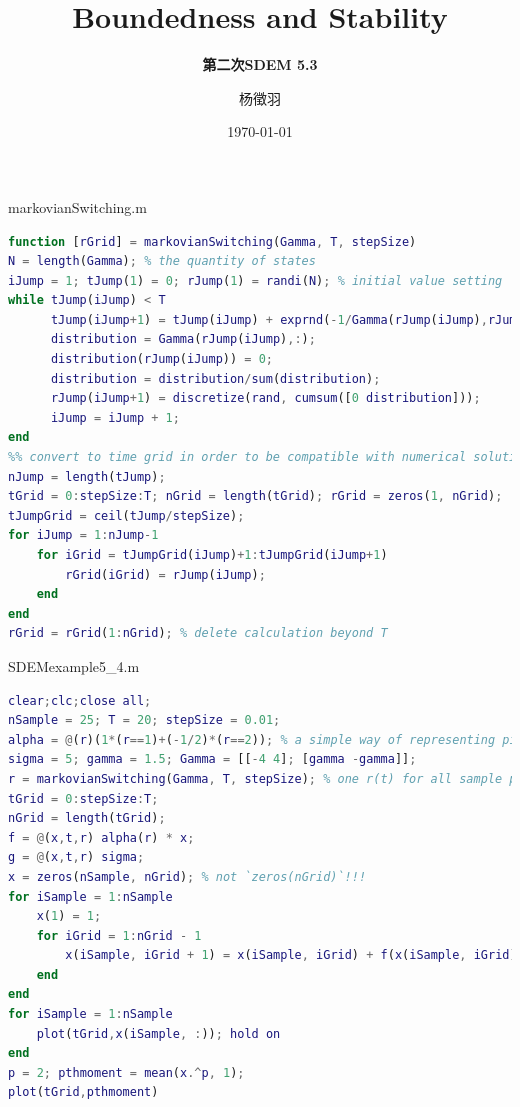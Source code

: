 \documentclass[10pt,aspectratio=43]{beamer}
\title{Boundedness and Stability}
\subtitle{\fontsize{9pt}{14pt}\textbf{第二次\quad SDEM 5.3}}
\author{杨徵羽}
\date{\today}
\begin{document}
\frame{\titlepage}

\begin{frame}[fragile]{markovianSwitching.m}
\begin{lstlisting}[language=matlab,
basicstyle=\ttfamily\scriptsize, 
numberstyle=\scriptsize]
function [rGrid] = markovianSwitching(Gamma, T, stepSize)
N = length(Gamma); % the quantity of states
iJump = 1; tJump(1) = 0; rJump(1) = randi(N); % initial value setting
while tJump(iJump) < T
      tJump(iJump+1) = tJump(iJump) + exprnd(-1/Gamma(rJump(iJump),rJump(iJump)));
      distribution = Gamma(rJump(iJump),:);
      distribution(rJump(iJump)) = 0;
      distribution = distribution/sum(distribution);
      rJump(iJump+1) = discretize(rand, cumsum([0 distribution]));
      iJump = iJump + 1;
end
%% convert to time grid in order to be compatible with numerical solutions
nJump = length(tJump);
tGrid = 0:stepSize:T; nGrid = length(tGrid); rGrid = zeros(1, nGrid);
tJumpGrid = ceil(tJump/stepSize);
for iJump = 1:nJump-1
    for iGrid = tJumpGrid(iJump)+1:tJumpGrid(iJump+1)
        rGrid(iGrid) = rJump(iJump);
    end
end
rGrid = rGrid(1:nGrid); % delete calculation beyond T
\end{lstlisting}
\end{frame}

\begin{frame}[fragile]{SDEMexample5\_4.m}
\begin{lstlisting}[language=matlab,
basicstyle=\ttfamily\scriptsize, 
numberstyle=\scriptsize]
clear;clc;close all;
nSample = 25; T = 20; stepSize = 0.01;
alpha = @(r)(1*(r==1)+(-1/2)*(r==2)); % a simple way of representing piecewise function
sigma = 5; gamma = 1.5; Gamma = [[-4 4]; [gamma -gamma]];
r = markovianSwitching(Gamma, T, stepSize); % one r(t) for all sample paths
tGrid = 0:stepSize:T;
nGrid = length(tGrid);
f = @(x,t,r) alpha(r) * x;
g = @(x,t,r) sigma;
x = zeros(nSample, nGrid); % not `zeros(nGrid)`!!!
for iSample = 1:nSample
    x(1) = 1;
    for iGrid = 1:nGrid - 1
        x(iSample, iGrid + 1) = x(iSample, iGrid) + f(x(iSample, iGrid), iGrid, r(iGrid)) * stepSize + g(x(iSample, iGrid), iGrid, r(iGrid)) * normrnd(0, stepSize);
    end
end
for iSample = 1:nSample
    plot(tGrid,x(iSample, :)); hold on
end
p = 2; pthmoment = mean(x.^p, 1);
plot(tGrid,pthmoment)
\end{lstlisting}
\end{frame}
\end{document}
